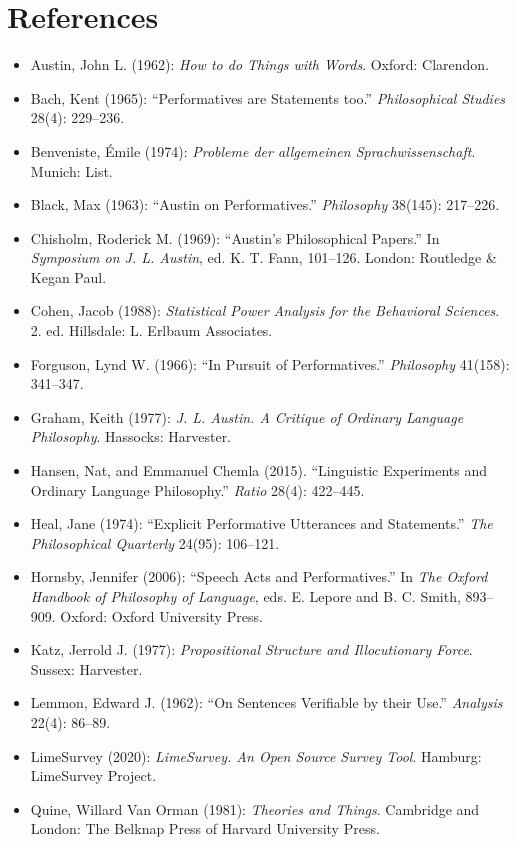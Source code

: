 \documentclass[egregdoesnotlikesansseriftitles,12pt]{scrartcl}
\begin{document}
\section*{References}
\begin{itemize}[label=,leftmargin=\parindent,itemindent=-\parindent]
   \item Austin, John L. (1962): \textit{How to do Things with Words}. Oxford: Clarendon.
   \item Bach, Kent (1965): ``Performatives are Statements too.'' \textit{Philosophical Studies} 28(4): 229--236.
   \item Benveniste, Émile (1974): \textit{Probleme der allgemeinen Sprachwissenschaft}. Munich: List.
   \item Black, Max (1963): ``Austin on Performatives.'' \textit{Philosophy} 38(145): 217--226.
   \item Chisholm, Roderick M. (1969): ``Austin's Philosophical Papers.'' In \textit{Symposium on J. L. Austin}, ed. K. T. Fann, 101--126. London: Routledge \& Kegan Paul.
   \item Cohen, Jacob (1988): \textit{Statistical Power Analysis for the Behavioral Sciences}. 2. ed. Hillsdale: L. Erlbaum Associates.
   \item Forguson, Lynd W. (1966): ``In Pursuit of Performatives.'' \textit{Philosophy} 41(158): 341--347.
   \item Graham, Keith (1977): \textit{J. L. Austin. A Critique of Ordinary Language Philosophy}. Hassocks: Harvester.
   \item Hansen, Nat, and Emmanuel Chemla (2015). ``Linguistic Experiments and Ordinary Language Philosophy.'' \textit{Ratio} 28(4): 422--445.
   \item Heal, Jane (1974): ``Explicit Performative Utterances and Statements.'' \textit{The Philosophical Quarterly} 24(95): 106--121.
   \item Hornsby, Jennifer (2006): ``Speech Acts and Performatives.'' In \textit{The Oxford Handbook of Philosophy of Language}, eds. E. Lepore and B. C. Smith, 893--909. Oxford: Oxford University Press.
   \item Katz, Jerrold J. (1977): \textit{Propositional Structure and Illocutionary Force}. Sussex: Harvester.
   \item Lemmon, Edward J. (1962): ``On Sentences Verifiable by their Use.'' \textit{Analysis} 22(4): 86--89.
   \item LimeSurvey (2020): \textit{LimeSurvey. An Open Source Survey Tool}. Hamburg: LimeSurvey Project.
   \item Quine, Willard Van Orman (1981): \textit{Theories and Things}. Cambridge and London: The Belknap Press of Harvard University Press.

\end{itemize}
\end{document}
